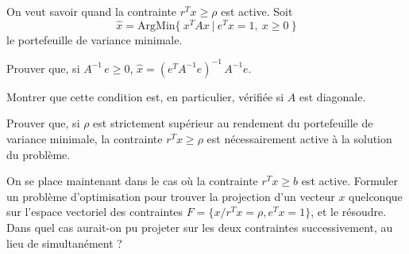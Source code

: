 \documentclass[12pt,a4paper,fleqn]{report}
\begin{document}
\begin{exercice}
  On veut savoir quand la contrainte $r^{T} x \geq \rho$ est
  active. Soit $$\hat x= \mathrm{ArgMin} \{\ x^{T} A x\ |\ e^{T} x=1, \
  x\geq 0\ \}$$ le portefeuille de variance minimale.
\begin{questions}
\item Prouver que, si $A^{-1}\,e\geq 0$, $\hat x=(e^{T} A^{-1} e)^{-1}\,A^{-1}e$.
\item Montrer que cette condition est, en particulier, v\'erifi\'ee si $A$ est diagonale.
\item Prouver que, si $\rho$ est strictement sup\'erieur au rendement du portefeuille de variance minimale, la contrainte $r^{T} x \geq \rho$ est n\'ecessairement active \`a la solution du probl\`eme.
\end{questions}
\end{exercice}

\begin{exercice}[(projection)]
  On se place maintenant dans le cas où la contrainte $r^{T} x \geq b$
  est active. Formuler un problème d'optimisation pour trouver la
  projection d'un vecteur $x$ quelconque sur l'espace vectoriel des
  contraintes $F = \{x / r^{T} x = \rho, e^{T} x = 1\}$, et le
  résoudre. Dans quel cas aurait-on pu projeter sur les deux
  contraintes successivement, au lieu de simultanément ?
\end{exercice}
\end{document}
